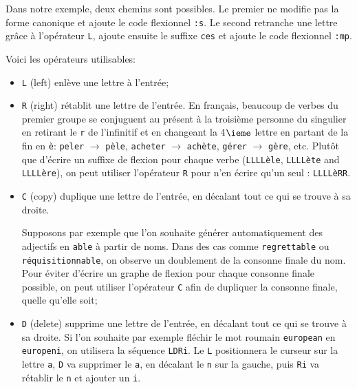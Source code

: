 \bigskip
\noindent Dans notre exemple, deux chemins sont possibles. Le premier ne modifie pas la forme
canonique et ajoute le code flexionnel \verb+:s+. Le second retranche une lettre grâce à l’opérateur 
\verb+L+, ajoute ensuite le suffixe \verb+ces+ et ajoute le code flexionnel \verb+:mp+.

Voici les opérateurs utilisables:

\begin{itemize}
\item \verb+L+ (left) enlève une lettre à l’entrée;
  	  
\item \verb+R+ (right)
             rétablit une lettre de l’entrée. En français, beaucoup de verbes du premier
  	  groupe se conjuguent au présent à la troisième personne du singulier en retirant le
  	  \verb+r+ de l’infinitif et en changeant la 4$\ieme$ lettre en partant de la fin en
  	  \texttt{è}: \verb+peler+ $\rightarrow$ \texttt{pèle},
  	  \verb+acheter+ $\rightarrow$ \texttt{achète}, \texttt{gérer}
  	  $\rightarrow$ \texttt{gère}, etc. Plutôt que d’écrire un suffixe de flexion
  	  pour chaque verbe (\texttt{LLLLèle}, \texttt{LLLLète} and
  	  \texttt{LLLLère}), on peut utiliser l’opérateur \verb+R+ pour n’en écrire qu’un seul :
  	  \texttt{LLLLèRR}.
  	  
\item \verb+C+ (copy)
             duplique une lettre de l’entrée, en décalant tout ce qui se trouve à sa droite.
  	  
Supposons par exemple que l’on souhaite générer automatiquement des adjectifs en
\verb+able+ à partir de noms. Dans des cas comme \verb+regrettable+ ou \verb+réquisitionnable+,
  on observe un doublement de la consonne finale du nom. Pour éviter d’écrire un
graphe de flexion pour chaque consonne finale possible, on peut utiliser l’opérateur
\verb+C+ afin de dupliquer la consonne finale, quelle qu’elle soit;
  
  \item \verb+D+ (delete)
             supprime une lettre de l’entrée, en décalant tout ce qui se trouve à sa  droite.
Si l’on souhaite par exemple fléchir le mot roumain \verb+european+ en \verb+europeni+, on utilisera
la séquence \verb+LDRi+. Le \verb+L+ positionnera le curseur sur la lettre \verb+a+, \verb+D+ va
supprimer le \verb+a+, en décalant le \verb+n+ sur la gauche, puis \verb+Ri+ va rétablir le \verb+n+
et ajouter un \verb+i+.


\end{itemize}
